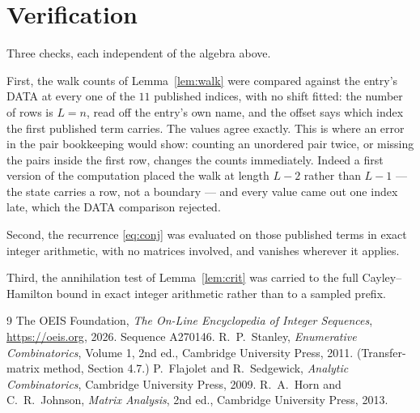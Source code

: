 \documentclass[11pt,a4paper]{article}
\theoremstyle{plain}
\theoremstyle{definition}
\begin{document}
\section{Verification}

Three checks, each independent of the algebra above.

First, the walk counts of Lemma~\ref{lem:walk} were compared against the entry's DATA at
every one of the $11$ published indices, with no shift fitted: the number of rows is
$L=n$, read off the entry's own name, and the offset says which index the first
published term carries. The values agree exactly. This is where an error in the pair
bookkeeping would show: counting an unordered pair twice, or missing the pairs inside the
first row, changes the counts immediately. Indeed a first version of the computation
placed the walk at length $L-2$ rather than $L-1$ --- the state carries a row, not a
boundary --- and every value came out one index late, which the DATA comparison rejected.

Second, the recurrence \eqref{eq:conj} was evaluated on those published terms in exact
integer arithmetic, with no matrices involved, and vanishes wherever it applies.

Third, the annihilation test of Lemma~\ref{lem:crit} was carried to the full
Cayley--Hamilton bound in exact integer arithmetic rather than to a sampled prefix.

\begin{thebibliography}{9}
 The OEIS Foundation, \emph{The On-Line Encyclopedia of Integer
Sequences}, \url{https://oeis.org}, 2026. Sequence A270146.
 R.~P.~Stanley, \emph{Enumerative Combinatorics}, Volume 1, 2nd ed.,
Cambridge University Press, 2011. (Transfer-matrix method, Section 4.7.)
 P.~Flajolet and R.~Sedgewick, \emph{Analytic Combinatorics}, Cambridge
University Press, 2009.
 R.~A.~Horn and C.~R.~Johnson, \emph{Matrix Analysis}, 2nd ed., Cambridge
University Press, 2013.
\end{thebibliography}
\end{document}

